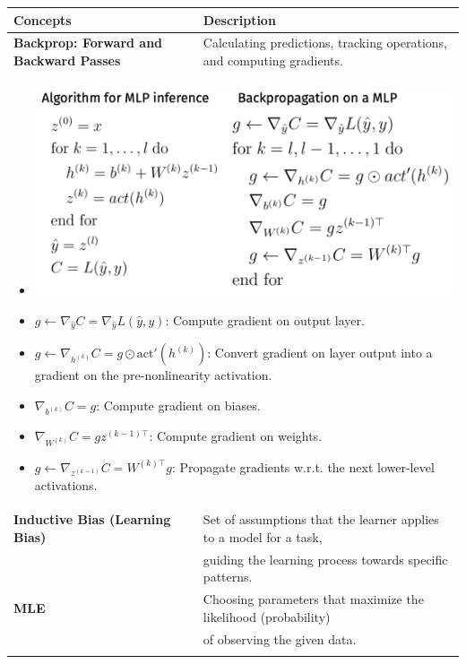 \begin{summary}
    \begin{center}
        \begin{tabular}{ll}
            \toprule
            \textbf{Concepts} & \textbf{Description} \\
            \midrule
            \textbf{Backprop: Forward and Backward Passes} & Calculating predictions, tracking operations, and computing gradients. \\
            \multicolumn{2}{p{\linewidth}}{
                \begin{itemize}
                    \item \includegraphics[width=0.5\linewidth]{../Images/L3_13.png}
                    \item $g \leftarrow \nabla_{\hat{y}} C = \nabla_{\hat{y}} L(\hat{y}, y)$: Compute gradient on output layer.
                    \item $g \leftarrow \nabla_{h^{(k)}} C = g \odot \text{act}'(h^{(k)})$: Convert gradient on layer output into a gradient on the pre-nonlinearity activation.
                    \item $\nabla_{b^{(k)}} C = g$: Compute gradient on biases.
                    \item $\nabla_{W^{(k)}} C = g z^{(k-1)\top}$: Compute gradient on weights.
                    \item $g \gets \nabla_{z^{(k-1)}} C = W^{(k)\top} g$: Propagate gradients w.r.t. the next lower-level activations.
                \end{itemize}
            } \\
            \midrule
            \textbf{Inductive Bias (Learning Bias)} & Set of assumptions that the learner applies to a model for a task, \\
            & guiding the learning process towards specific patterns. \\ 
            \midrule
            \textbf{MLE} & Choosing parameters that maximize the likelihood (probability) \\
            & of observing the given data. \\
            \multicolumn{2}{p{\linewidth}}{
}
\end{tabular}
\end{center}
\end{summary}
